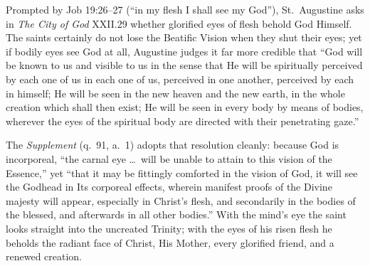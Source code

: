 Prompted by Job 19:26--27 (``in my flesh I shall see my God''), St.\ Augustine asks in \textit{The City of God} XXII.29 whether glorified eyes of flesh behold God Himself. The saints certainly do not lose the Beatific Vision when they shut their eyes; yet if bodily eyes see God at all, Augustine judges it far more credible that ``God will be known to us and visible to us in the sense that He will be spiritually perceived by each one of us in each one of us, perceived in one another, perceived by each in himself; He will be seen in the new heaven and the new earth, in the whole creation which shall then exist; He will be seen in every body by means of bodies, wherever the eyes of the spiritual body are directed with their penetrating gaze.''

The \textit{Supplement} (q.\ 91, a.\ 1) adopts that resolution cleanly: because God is incorporeal, ``the carnal eye \dots\ will be unable to attain to this vision of the Essence,'' yet ``that it may be fittingly comforted in the vision of God, it will see the Godhead in Its corporeal effects, wherein manifest proofs of the Divine majesty will appear, especially in Christ's flesh, and secondarily in the bodies of the blessed, and afterwards in all other bodies.'' With the mind's eye the saint looks straight into the uncreated Trinity; with the eyes of his risen flesh he beholds the radiant face of Christ, His Mother, every glorified friend, and a renewed creation.
